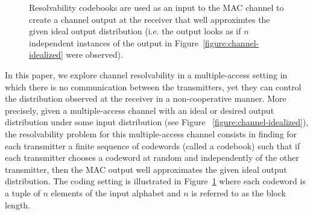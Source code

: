 \documentclass[journal]{IEEEtran}
\newcommand{\channelpmf}{q}
\newcommand{\codebookpmf}{p}
\newcommand{\channelInOne}{X}
\newcommand{\channelInTwo}{Y}
\newcommand{\channelOut}{Z}
\newcommand{\channel}{\mathcal{W}}
\newcommand{\codebookOne}{\mathcal{C}_1}
\newcommand{\codebookTwo}{\mathcal{C}_2}
\newcommand{\codebookBlocklength}{n}
\newcommand{\messageRV}{M}
\begin{document}
\begin{figure}
\begin{center}
\end{center}
\caption{Resolvability codebooks are used as an input to the MAC
  channel to create a channel output at the receiver that well
  approximtes the given ideal output distribution (i.e. the output
  looks as if  $\codebookBlocklength$ independent instances of the
  output in Figure~\ref{figure:channel-idealized} were observed).}
\label{figure:channel-resolved}
\end{figure}

In this paper, we explore channel resolvability in a multiple-access
setting in which there is no communication between the transmitters,
yet they can control the distribution observed at the receiver in a
non-cooperative manner. More precisely, given a multiple-access
channel with an ideal or desired output distribution under some input
distribution (see Figure ~\ref{figure:channel-idealized}), the
resolvability problem for this multiple-access channel consists in
finding for each transmitter a finite sequence of codewords (called a
codebook) such that if each transmitter chooses a codeword at random
and independently of the other transmitter, then the MAC output well
approximates the given ideal output distribution. The coding setting
is illustrated in Figure~\ref{figure:channel-resolved} where each
codeword is a tuple of $\codebookBlocklength$ elements of the input
alphabet and $\codebookBlocklength$ is referred to as the block length.
\end{document}
